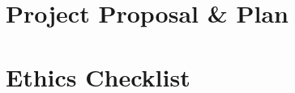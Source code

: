 \titleformat{\chapter}[hang]
    {\normalfont\Huge\bfseries}{\chaptertitlename\ \thechapter\ -\ }{0pt}{\Huge}
\titlespacing*{\chapter}{0pt}{0pt}{20pt}


\begin{appendices}

\chapter{Project Proposal \& Plan}
\thispagestyle{fancy} %


\chapter{Ethics Checklist}
\thispagestyle{fancy} %



\end{appendices}
